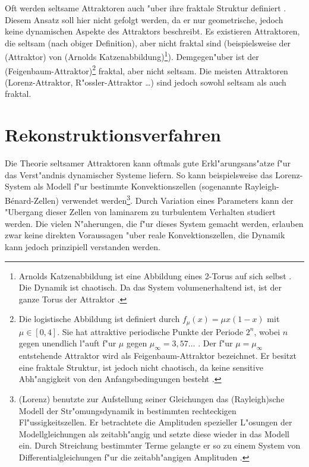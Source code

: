 Oft werden seltsame Attraktoren auch "uber ihre fraktale Struktur definiert
\cite{Peitgen92}. Diesem Ansatz soll hier nicht gefolgt werden, da er nur geometrische,
jedoch keine dynamischen Aspekte des Attraktors beschreibt. Es existieren Attraktoren, die
seltsam (nach obiger Definition), aber nicht fraktal sind (beispielsweise der
\naja(Attraktor) von \begriff(Arnolds Katzenabbildung)\footnote{Arnolds Katzenabbildung
  ist eine Abbildung eines 2-Torus auf sich selbst \cite{Arnold68}. Die Dynamik ist
  chaotisch. Da das System volumenerhaltend ist, ist der ganze Torus der Attraktor
  \cite{Eckmann-ruelle}.  }). Demgegen"uber ist der
\begriff(Feigenbaum-Attraktor)\footnote{Die logistische Abbildung ist definiert durch
  $f_\mu(x)=\mu x(1-x)$ mit $\mu\in[0,4]$. Sie hat attraktive periodische Punkte der
  Periode $2^n$, wobei $n$ gegen unendlich l"auft f"ur $\mu$ gegen $\mu_\infty=3,57\dots$
  . Der f"ur $\mu=\mu_\infty$ entstehende Attraktor wird als Feigenbaum-Attraktor
  bezeichnet. Er besitzt eine fraktale Struktur, ist jedoch nicht chaotisch, da keine
  sensitive Abh"angigkeit von den Anfangsbedingungen besteht \cite{Eckmann-ruelle}.}
fraktal, aber nicht seltsam.  Die meisten Attraktoren (Lorenz-Attraktor,
R"ossler-Attraktor \dots) sind jedoch sowohl seltsam als auch fraktal.


\section{Rekonstruktionsverfahren}

Die Theorie seltsamer Attraktoren kann oftmals gute Erkl"arungsans"atze f"ur das
Ver\-st"andnis dynamischer Systeme liefern. So kann beispielsweise das Lorenz-System als
Modell f"ur bestimmte Konvektionszellen (sogenannte Rayleigh-B\'enard-Zellen) verwendet
werden\footnote{\autor(Lorenz) benutzte zur Aufstellung seiner Gleichungen das
  \autor(Rayleigh)sche Modell der Str"omungsdynamik in bestimmten rechteckigen
  Fl"ussigkeitszellen. Er betrachtete die Amplituden spezieller L"osungen der
  Modellgleichungen als zeitabh"angig und setzte diese wieder in das Modell ein. Durch
  Streichung bestimmter Terme gelangte er so zu einem System von Differentialgleichungen
  f"ur die zeitabh"angigen Amplituden \cite{Peitgen92}.}. Durch Variation eines Parameters kann der
"Ubergang dieser Zellen von laminarem zu turbulentem Verhalten studiert werden. Die vielen
N"aherungen, die f"ur dieses System gemacht werden, erlauben zwar keine direkten
Voraussagen "uber reale Konvektionszellen, die Dynamik kann jedoch prinzipiell verstanden
werden.

